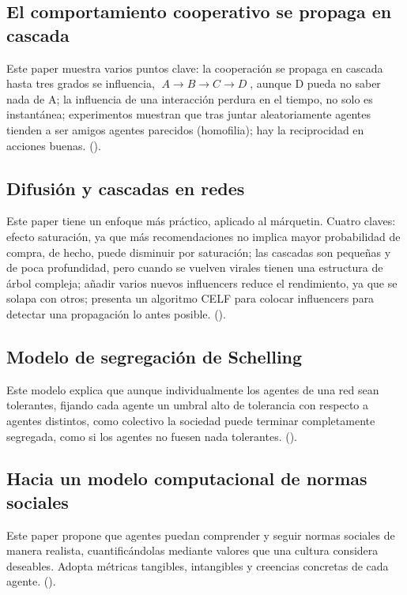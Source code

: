 \documentclass[12pt]{extarticle}
\numberwithin{equation}{section}
\begin{document}
\subsection{El comportamiento cooperativo se propaga en cascada}
Este paper muestra varios puntos clave: la cooperación se propaga en cascada hasta tres grados se influencia, $\;A \rightarrow B \rightarrow C \rightarrow D\;$, aunque D pueda no saber nada de A; la influencia de una interacción perdura en el tiempo, no solo es instantánea; experimentos muestran que tras juntar aleatoriamente agentes tienden a ser amigos agentes parecidos (homofilia); hay la reciprocidad en acciones buenas. (\cite{CooperativeCascades}). \vspace{0.5em}

\subsection{Difusión y cascadas en redes}
Este paper tiene un enfoque más práctico, aplicado al márquetin. Cuatro claves: efecto saturación, ya que más recomendaciones no implica mayor probabilidad de compra, de hecho, puede disminuir por saturación; las cascadas son pequeñas y de poca profundidad, pero cuando se vuelven virales tienen una estructura de árbol compleja; añadir varios nuevos influencers reduce el rendimiento, ya que se solapa con otros; presenta un algoritmo CELF para colocar influencers para detectar una propagación lo antes posible. (\cite{BehaviorCascades}). \vspace{0.5em}

\subsection{Modelo de segregación de Schelling}
Este modelo explica que aunque individualmente los agentes de una red sean tolerantes, fijando cada agente un umbral alto de tolerancia con respecto a agentes distintos, como colectivo la sociedad puede terminar completamente segregada, como si los agentes no fuesen nada tolerantes. (\cite{SchellingModel}). \vspace{0.5em}

\subsection{Hacia un modelo computacional de normas sociales}
Este paper propone que agentes puedan comprender y seguir normas sociales de manera realista, cuantificándolas mediante valores que una cultura considera deseables. Adopta métricas tangibles, intangibles y creencias concretas de cada agente. (\cite{SocialComputationalModel2018}). \vspace{0.5em}
\end{document}
